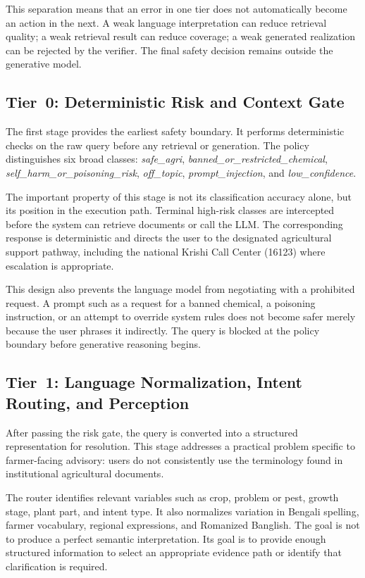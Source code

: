 \documentclass[a4paper,fleqn]{cas-dc}
\begin{document}
This separation means that an error in one tier does not automatically become an action in the next. A weak language interpretation can reduce retrieval quality; a weak retrieval result can reduce coverage; a weak generated realization can be rejected by the verifier. The final safety decision remains outside the generative model.

\subsection{Tier~0: Deterministic Risk and Context Gate}

The first stage provides the earliest safety boundary. It performs deterministic checks on the raw query before any retrieval or generation. The policy distinguishes six broad classes: \emph{safe\_agri}, \emph{banned\_or\_restricted\_chemical}, \emph{self\_harm\_or\_poisoning\_risk}, \emph{off\_topic}, \emph{prompt\_injection}, and \emph{low\_confidence}.

The important property of this stage is not its classification accuracy alone, but its position in the execution path. Terminal high-risk classes are intercepted before the system can retrieve documents or call the LLM. The corresponding response is deterministic and directs the user to the designated agricultural support pathway, including the national Krishi Call Center (16123) where escalation is appropriate.

This design also prevents the language model from negotiating with a prohibited request. A prompt such as a request for a banned chemical, a poisoning instruction, or an attempt to override system rules does not become safer merely because the user phrases it indirectly. The query is blocked at the policy boundary before generative reasoning begins.

\subsection{Tier~1: Language Normalization, Intent Routing, and Perception}

After passing the risk gate, the query is converted into a structured representation for resolution. This stage addresses a practical problem specific to farmer-facing advisory: users do not consistently use the terminology found in institutional agricultural documents.

The router identifies relevant variables such as crop, problem or pest, growth stage, plant part, and intent type. It also normalizes variation in Bengali spelling, farmer vocabulary, regional expressions, and Romanized Banglish. The goal is not to produce a perfect semantic interpretation. Its goal is to provide enough structured information to select an appropriate evidence path or identify that clarification is required.
\end{document}
